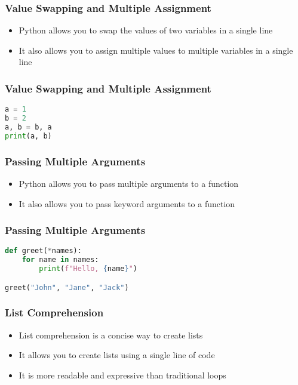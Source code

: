 \documentclass[serif, 9pt, aspectratio=32]{beamer}
\begin{document}
\begin{frame}
    \centering
    \frametitle{Value Swapping and Multiple Assignment}
    \begin{itemize}
        \setlength{\itemsep}{2em}
        \item Python allows you to swap the values of two variables in a single line
        \item It also allows you to assign multiple values to multiple variables in a single line
    \end{itemize}
\end{frame}

\begin{frame}[fragile]
    \frametitle{Value Swapping and Multiple Assignment}
    \begin{lstlisting}[language=Python]
a = 1
b = 2
a, b = b, a
print(a, b)
    \end{lstlisting}
\end{frame}

\begin{frame}
    \centering
    \frametitle{Passing Multiple Arguments}
    \begin{itemize}
        \setlength{\itemsep}{2em}
        \item Python allows you to pass multiple arguments to a function
        \item It also allows you to pass keyword arguments to a function
    \end{itemize}
\end{frame}

\begin{frame}[fragile]
    \frametitle{Passing Multiple Arguments}
    \begin{lstlisting}[language=Python]
def greet(*names):
    for name in names:
        print(f"Hello, {name}")

greet("John", "Jane", "Jack")
    \end{lstlisting}
\end{frame}

\begin{frame}
    \centering
    \frametitle{List Comprehension}
    \begin{itemize}
        \setlength{\itemsep}{2em}
        \item List comprehension is a concise way to create lists
        \item It allows you to create lists using a single line of code
        \item It is more readable and expressive than traditional loops
    \end{itemize}
\end{frame}
\end{document}
